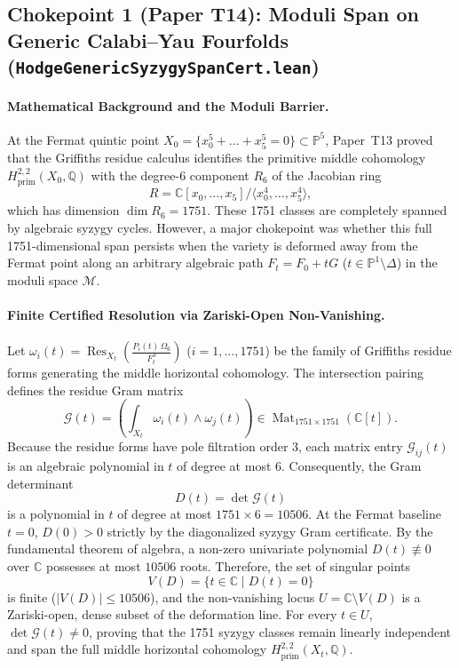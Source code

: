 \documentclass[11pt,a4paper]{article}
\begin{document}
\subsection{Chokepoint 1 (Paper T14): Moduli Span on Generic Calabi--Yau Fourfolds (\texttt{HodgeGenericSyzygySpanCert.lean})}

\paragraph{Mathematical Background and the Moduli Barrier.}
At the Fermat quintic point $X_0 = \{x_0^5 + \dots + x_5^5 = 0\} \subset \mathbb{P}^5$, Paper~T13 proved that the Griffiths residue calculus identifies the primitive middle cohomology $H^{2,2}_{\mathrm{prim}}(X_0, \mathbb{Q})$ with the degree-6 component $R_6$ of the Jacobian ring
\[
  R = \mathbb{C}[x_0,\dots,x_5] / \langle x_0^4, \dots, x_5^4 \rangle,
\]
which has dimension $\dim R_6 = 1751$. These 1751 classes are completely spanned by algebraic syzygy cycles. However, a major chokepoint was whether this full 1751-dimensional span persists when the variety is deformed away from the Fermat point along an arbitrary algebraic path $F_t = F_0 + t G$ ($t \in \mathbb{P}^1 \setminus \Delta$) in the moduli space $\mathcal{M}$.

\paragraph{Finite Certified Resolution via Zariski-Open Non-Vanishing.}
Let $\omega_i(t) = \operatorname{Res}_{X_t} \left( \frac{P_i(t)\,\Omega_6}{F_t^3} \right)$ ($i = 1,\dots,1751$) be the family of Griffiths residue forms generating the middle horizontal cohomology. The intersection pairing defines the residue Gram matrix
\[
  \mathcal{G}(t) = \left( \int_{X_t} \omega_i(t) \wedge \omega_j(t) \right) \in \operatorname{Mat}_{1751 \times 1751}(\mathbb{C}[t]).
\]
Because the residue forms have pole filtration order $3$, each matrix entry $\mathcal{G}_{ij}(t)$ is an algebraic polynomial in $t$ of degree at most $6$. Consequently, the Gram determinant
\[
  D(t) = \det \mathcal{G}(t)
\]
is a polynomial in $t$ of degree at most $1751 \times 6 = 10506$. At the Fermat baseline $t = 0$, $D(0) > 0$ strictly by the diagonalized syzygy Gram certificate. By the fundamental theorem of algebra, a non-zero univariate polynomial $D(t) \not\equiv 0$ over $\mathbb{C}$ possesses at most $10506$ roots. Therefore, the set of singular points
\[
  V(D) = \{ t \in \mathbb{C} \mid D(t) = 0 \}
\]
is finite ($|V(D)| \le 10506$), and the non-vanishing locus $U = \mathbb{C} \setminus V(D)$ is a Zariski-open, dense subset of the deformation line. For every $t \in U$, $\det \mathcal{G}(t) \ne 0$, proving that the 1751 syzygy classes remain linearly independent and span the full middle horizontal cohomology $H^{2,2}_{\mathrm{prim}}(X_t, \mathbb{Q})$.
\end{document}
